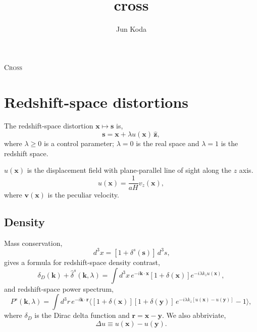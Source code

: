 \documentclass[a4paper,11pt, fleqn]{article}
\title{cross}
\author{Jun Koda}
\date{}
\begin{document}
%
%
\vspace{0.3 \paperheight}

\begin{center}
  {\Huge \textsc{Cross}}
\end{center}

\tableofcontents

\sectionfont{\sffamily\Huge\color{Green}\selectfont}
\subsectionfont{\sffamily\color{Green}\selectfont}
\subsubsectionfont{\sffamily\color{Green}\selectfont}
\paragraphfont{\sffamily\color{Green}\selectfont}

%
%
\newpage

\section{Redshift-space distortions}

The redshift-space distortion $\bm{x} \mapsto \bm{s}$ is,
%
\begin{equation}
  \bm{s} = \bm{x} + \lambda u(\bm{x}) \, \hat{\bm{z}},
\end{equation}
where $\lambda \ge 0$ is a control parameter; $\lambda = 0$ is the real space and $\lambda = 1$ is the redshift space.

$u(\bm{x})$ is the displacement field with plane-parallel line of
sight along the $z$ axis.
\begin{equation}
  u(\bm{x}) = \frac{1}{aH} v_z(\bm{x}),
\end{equation}
where $\bm{v}(\bm{x})$ is the peculiar velocity.

\vspace{5mm}
\subsection{Density}

Mass conservation,
%
\begin{equation}
  [1 + \delta(\bm{x})] \,d^3 x = [1 + \delta^s(\bm{s})] \,d^3 s,
\end{equation}
%
gives a formula for redshift-space density contrast,
%
\begin{equation}
  \label{eq:delta-s}
  \delta_D(\bm{k}) + \hat{\delta}^s(\bm{k}, \lambda)
  = \int \! d^3 x \, e^{-i\bm{k}\cdot\bm{x}} [1 + \delta(\bm{x})]
    e^{-i \lambda k_z u(\bm{x})},
\end{equation}
%
and redshift-space power spectrum,
%
\begin{equation}
  P^s(\bm{k}, \lambda) = \int \! d^3 r \, e^{-i\bm{k}\cdot\bm{r}}
  \Big\langle
      [1 + \delta(\bm{x})][1 + \delta(\bm{y})] \,
      e^{-i \lambda k_z [u(\bm{x}) - u(\bm{y})]} - 1\Big\rangle,
\end{equation}
where $\delta_D$ is the Dirac delta function and $\bm{r} = \bm{x} - \bm{y}$.
We also abbriviate,
\begin{equation}
  \Delta u \equiv u(\bm{x}) - u(\bm{y}).
\end{equation}
\end{document}
